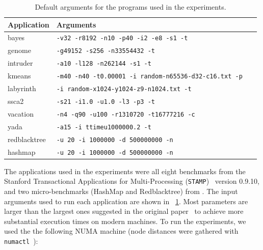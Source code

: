 \begin{table}[!tb]
	\small
	\centering
	\caption{Default arguments for the programs used in the experiments.}
	\label{tab:defaultParams}
	\begin{tabularx}{\textwidth}{@{}lXl@{}}
		\toprule
		Application & Arguments                                          \\ \midrule
		bayes                & \texttt{-v32 -r8192 -n10 -p40 -i2 -e8 -s1 -t \thNumber}                \\
		genome               & \texttt{-g49152 -s256 -n33554432 -t \thNumber}                         \\
		intruder             & \texttt{-a10 -l128 -n262144 -s1 -t \thNumber}                          \\
		kmeans               & \texttt{-m40 -n40 -t0.00001 -i random-n65536-d32-c16.txt -p \thNumber}\\
		labyrinth            & \texttt{-i random-x1024-y1024-z9-n1024.txt -t \thNumber}               \\
		ssca2                & \texttt{-s21 -i1.0 -u1.0 -l3 -p3 -t \thNumber}                         \\
		vacation             & \texttt{-n4 -q90 -u100 -r1310720 -t16777216 -c \thNumber}              \\
		yada                 & \texttt{-a15 -i ttimeu1000000.2 -t \thNumber}                          \\
		redblacktree			& \texttt{-u 20 -i 1000000 -d 500000000 -n \thNumber}                          \\
		hashmap			& \texttt{-u 20 -i 1000000 -d 500000000 -n \thNumber}                          \\
		\bottomrule
	\end{tabularx}
\end{table}

The applications used in the experiments were all eight benchmarks from the Stanford Transactional Applications for Multi-Processing (\texttt{STAMP})~\cite{STAMP} version 0.9.10, and two micro-benchmarks (HashMap and Redblacktree) from . The input arguments used to run each application are shown in \tablename~\ref{tab:defaultParams}. Most parameters are larger than the largest ones suggested in the original paper~\cite{STAMP} to achieve more substantial execution times on modern machines. To run the experiments, we used the the following NUMA machine (node distances were gathered with \texttt{numactl}~\cite{libnuma}):

